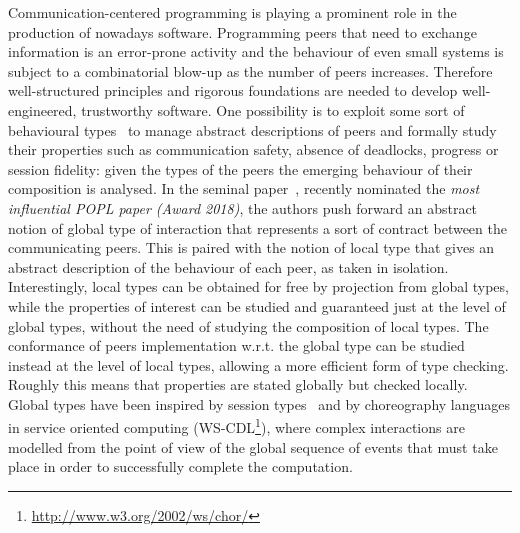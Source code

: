 
Communication-centered programming is playing a prominent role in the production of nowadays software. Programming peers that need to exchange information is an error-prone activity and the behaviour of even small systems is subject to a combinatorial blow-up as the number of peers increases.
Therefore well-structured principles and rigorous foundations are needed to develop well-engineered, trustworthy software. 
One possibility is to exploit some sort of behavioural types~\cite{DBLP:journals/csur/HuttelLVCCDMPRT16,dd09} to manage abstract descriptions of peers and formally study their properties such as communication safety, absence of deadlocks, progress or session fidelity: given the types of the peers the emerging behaviour of their composition is analysed.
In the seminal paper~\cite{DBLP:conf/popl/HondaYC08}, recently nominated the \emph{most influential POPL paper (Award 2018)}, the authors push forward an abstract notion of global type of interaction that represents a sort of contract between the communicating peers. This is paired with the notion of local type that gives an abstract description of the behaviour of each peer, as taken in isolation.
Interestingly, local types can be obtained for free by projection from global types, while the properties of interest can be studied and guaranteed just at the level of global types, without the need of studying the composition of local types. The conformance of peers implementation w.r.t. the global type can be studied instead at the level of local types, allowing a more efficient form of type checking. Roughly this means that properties are stated globally but checked locally. Global types have been inspired by session types~\cite{DBLP:conf/esop/HondaVK98} and by choreography languages in service oriented computing (WS-CDL\footnote{\url{http://www.w3.org/2002/ws/chor/}}), where complex interactions are modelled from the point of view of the global sequence of events that must take place in order to successfully complete the computation.

